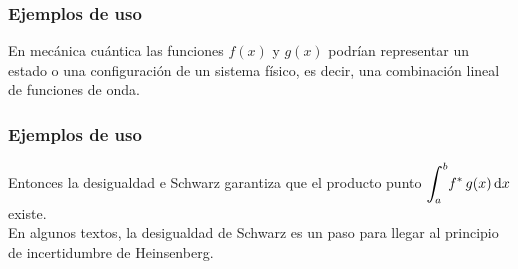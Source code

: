 \documentclass[12pt]{beamer}
\begin{document}
\begin{frame}
\frametitle{Ejemplos de uso}
En mecánica cuántica las funciones $f(x)$ y $g(x)$ podrían representar un estado o una configuración de un sistema físico, es decir, una combinación lineal de funciones de onda.
\end{frame}
\begin{frame}
\frametitle{Ejemplos de uso}
Entonces la desigualdad e Schwarz garantiza que el producto punto $\displaystyle \scaleint{6ex}_{\bs a}^{b} f^{*} \, g(x) \dd{x}$ existe. 
\\
\bigskip
\pause
En algunos textos, la desigualdad de Schwarz es un paso para llegar al principio de incertidumbre de Heinsenberg.
\end{frame}
\end{document}
